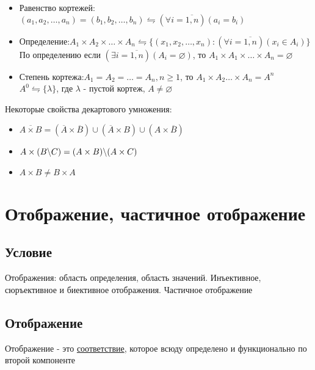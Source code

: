 \documentclass{report}
\newcommand{\bslash}{\space \backslash \space}
\begin{document}
\begin{itemize}
    \item Равенство кортежей:\newline$(a_1,a_2,\ldots,a_n) = (b_1, b_2,\ldots,b_n) \leftrightharpoons (\forall i = \overline{1,n})(a_i = b_i)$
    \item Определение:\newline$A_1 \times A_2 \times \ldots \times A_n \leftrightharpoons \{(x_1, x_2, \ldots, x_n):(\forall i = \overline{1,n})(x_i \in A_i)\}$\newline
          По определению если $(\exists i = \overline{1,n})(A_i = \varnothing)$, то $A_1 \times A_1 \times \ldots \times A_n = \varnothing$
    \item Степень кортежа: $A_1 = A_2 = \ldots = A_n, n \geq 1$, то $A_1 \times A_2 \ldots \times A_n = A^n$\newline
          $A^0 \leftrightharpoons \{\lambda\}$, где $\lambda$ - пустой кортеж, $A \neq \varnothing$
\end{itemize}

Некоторые свойства декартового умножения:
\begin{itemize}
    \item $\overline{A \times B} = (\overline{A} \times \overline{B}) \cup (\overline{A} \times B) \cup (A \times \overline{B})$
    \item $A \times (B \bslash C) = (A \times B) \bslash (A \times C)$
    \item $A \times B \neq B \times A$
\end{itemize}
\newpage

\section{Отображение, частичное отображение}
\subsection{Условие}
Отображения: область определения, область значений. Инъективное, сюръективное и биективное отображения. Частичное отображение

\subsection{Отображение}
Отображение - это \underline{соответствие}, которое всюду определено и функционально по второй компоненте

\medskip
\end{document}
